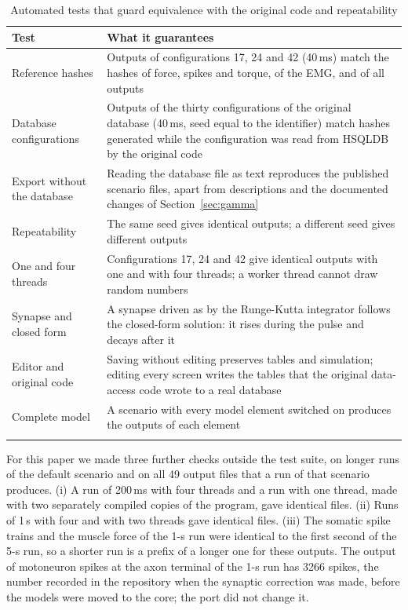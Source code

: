 \documentclass[pdflatex,sn-apa,iicol]{sn-jnl}
\begin{document}
\begin{table}[t]
\caption{Automated tests that guard equivalence with the original code and repeatability}\label{tab:tests}
\begin{tabular}{@{}p{}p{}@{}}
\toprule
Test & What it guarantees \\
\midrule
Reference hashes & Outputs of configurations 17, 24 and 42 (40\,ms) match the hashes of force, spikes and torque, of the EMG, and of all outputs \\
Database configurations & Outputs of the thirty configurations of the original database (40\,ms, seed equal to the identifier) match hashes generated while the configuration was read from HSQLDB by the original code \\
Export without the database & Reading the database file as text reproduces the published scenario files, apart from descriptions and the documented changes of Section~\ref{sec:gamma} \\
Repeatability & The same seed gives identical outputs; a different seed gives different outputs \\
One and four threads & Configurations 17, 24 and 42 give identical outputs with one and with four threads; a worker thread cannot draw random numbers \\
Synapse and closed form & A synapse driven as by the Runge-Kutta integrator follows the closed-form solution: it rises during the pulse and decays after it \\
Editor and original code & Saving without editing preserves tables and simulation; editing every screen writes the tables that the original data-access code wrote to a real database \\
Complete model & A scenario with every model element switched on produces the outputs of each element \\
\botrule
\end{tabular}
\end{table}

For this paper we made three further checks outside the test suite, on longer runs of the default scenario and on all 49 output files that a run of that scenario produces. (i) A run of 200\,ms with four threads and a run with one thread, made with two separately compiled copies of the program, gave identical files. (ii) Runs of 1\,s with four and with two threads gave identical files. (iii) The somatic spike trains and the muscle force of the 1-s run were identical to the first second of the 5-s run, so a shorter run is a prefix of a longer one for these outputs. The output of motoneuron spikes at the axon terminal of the 1-s run has 3266 spikes, the number recorded in the repository when the synaptic correction was made, before the models were moved to the core; the port did not change it.
\end{document}
